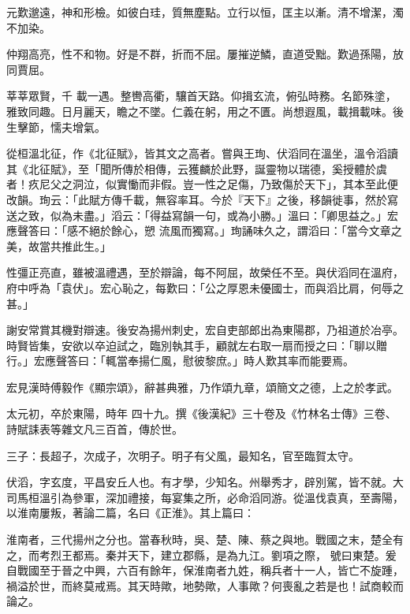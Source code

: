 \begin{pinyinscope}
 元歎邈遠，神和形檢。如彼白珪，質無塵點。立行以恒，匡主以漸。清不增潔，濁不加染。



 仲翔高亮，性不和物。好是不群，折而不屈。屢摧逆鱗，直道受黜。歎過孫陽，放同賈屈。



 莘莘眾賢，千
 載一遇。整轡高衢，驤首天路。仰揖玄流，俯弘時務。名節殊塗，雅致同趣。日月麗天，瞻之不墜。仁義在躬，用之不匱。尚想遐風，載揖載味。後生擊節，懦夫增氣。



 從桓溫北征，作《北征賦》，皆其文之高者。嘗與王珣、伏滔同在溫坐，溫令滔讀其《北征賦》，至「聞所傳於相傳，云獲麟於此野，誕靈物以瑞德，奚授體於虞者！疚尼父之洞泣，似實慟而非假。豈一性之足傷，乃致傷於天下」，其本至此便改韻。珣云：「此賦方傳千載，無容率耳。今於『天下』之後，移韻徙事，然於寫送之致，似為未盡。」滔云：「得益寫韻一句，或為小勝。」溫曰：「卿思益之。」宏應聲答曰：「感不絕於餘心，愬
 流風而獨寫。」珣誦味久之，謂滔曰：「當今文章之美，故當共推此生。」



 性彊正亮直，雖被溫禮遇，至於辯論，每不阿屈，故榮任不至。與伏滔同在溫府，府中呼為「袁伏」。宏心恥之，每歎曰：「公之厚恩未優國士，而與滔比肩，何辱之甚。」



 謝安常賞其機對辯速。後安為揚州刺史，宏自吏部郎出為東陽郡，乃祖道於冶亭。時賢皆集，安欲以卒迫試之，臨別執其手，顧就左右取一扇而授之曰：「聊以贈行。」宏應聲答曰：「輒當奉揚仁風，慰彼黎庶。」時人歎其率而能要焉。



 宏見漢時傅毅作《顯宗頌》，辭甚典雅，乃作頌九章，頌簡文之德，上之於孝武。



 太元初，卒於東陽，時年
 四十九。撰《後漢紀》三十卷及《竹林名士傳》三卷、詩賦誄表等雜文凡三百首，傳於世。



 三子：長超子，次成子，次明子。明子有父風，最知名，官至臨賀太守。



 伏滔，字玄度，平昌安丘人也。有才學，少知名。州舉秀才，辟別駕，皆不就。大司馬桓溫引為參軍，深加禮接，每宴集之所，必命滔同游。從溫伐袁真，至壽陽，以淮南屢叛，著論二篇，名曰《正淮》。其上篇曰：



 淮南者，三代揚州之分也。當春秋時，吳、楚、陳、蔡之與地。戰國之末，楚全有之，而考烈王都焉。秦并天下，建立郡縣，是為九江。劉項之際，
 號曰東楚。爰自戰國至于晉之中興，六百有餘年，保淮南者九姓，稱兵者十一人，皆亡不旋踵，禍溢於世，而終莫戒焉。其天時歟，地勢歟，人事歟？何喪亂之若是也！試商較而論之。




\end{pinyinscope}
